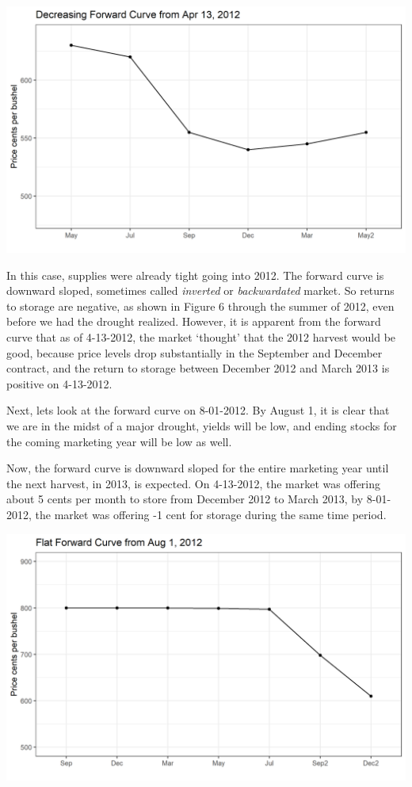 \documentclass[
  letterpaper,
  DIV=11,
  numbers=noendperiod]{scrreprt}
\begin{document}
\includegraphics{assets/PricesSpaceTime-decreasing-4-13-2012.png}

In this case, supplies were already tight going into 2012. The forward
curve is downward sloped, sometimes called \emph{inverted} or
\emph{backwardated} market. So returns to storage are negative, as shown
in Figure 6 through the summer of 2012, even before we had the drought
realized. However, it is apparent from the forward curve that as of
4-13-2012, the market `thought' that the 2012 harvest would be good,
because price levels drop substantially in the September and December
contract, and the return to storage between December 2012 and March 2013
is positive on 4-13-2012.

Next, lets look at the forward curve on 8-01-2012. By August 1, it is
clear that we are in the midst of a major drought, yields will be low,
and ending stocks for the coming marketing year will be low as well.

Now, the forward curve is downward sloped for the entire marketing year
until the next harvest, in 2013, is expected. On 4-13-2012, the market
was offering about 5 cents per month to store from December 2012 to
March 2013, by 8-01-2012, the market was offering -1 cent for storage
during the same time period.

\includegraphics{assets/PricesSpaceTime-flat-8-01-2012.png}
\end{document}
